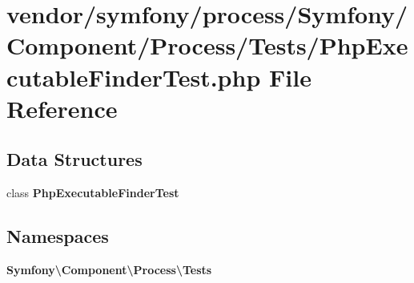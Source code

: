 \section{vendor/symfony/process/\+Symfony/\+Component/\+Process/\+Tests/\+Php\+Executable\+Finder\+Test.php File Reference}
\label{_php_executable_finder_test_8php}
\subsection*{Data Structures}
\begin{DoxyCompactItemize}
\item 
class {\bf Php\+Executable\+Finder\+Test}
\end{DoxyCompactItemize}
\subsection*{Namespaces}
\begin{DoxyCompactItemize}
\item 
 {\bf Symfony\textbackslash{}\+Component\textbackslash{}\+Process\textbackslash{}\+Tests}
\end{DoxyCompactItemize}
